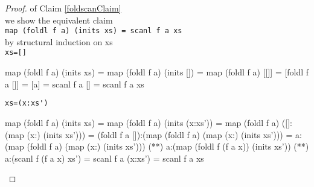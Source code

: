 \begin{proof} of Claim \ref{foldscanClaim}\\
we show the equivalent claim \\
\verb|map (foldl f a) (inits xs) = scanl f a xs|\\
by structural induction on xs\\
\verb|xs=[]|
\begin{code}
map (foldl f a) (inits xs) 
           = map (foldl f a) (inits [])
           = map (foldl f a) [[]]
           = [foldl f a []]
           = [a]
           = scanl f a []
           = scanl f a xs
\end{code}
\verb|xs=(x:xs')|
\begin{code}
map (foldl f a) (inits xs) 
           = map (foldl f a) (inits (x:xs'))
           = map (foldl f a) ([]:(map (x:) (inits xs')))
           = (foldl f a []):(map (foldl f a) (map (x:) (inits xs')))
           = a:(map (foldl f a) (map (x:) (inits xs')))
           (*\sEq{\ref{mapfoldlLemma}}*) a:(map (foldl f (f a x)) (inits xs'))
           (**) a:(scanl f (f a x) xs')
           = scanl f a (x:xs')
           = scanl f a xs
\end{code}
\end{proof}
